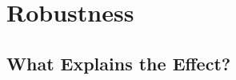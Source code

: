 \documentclass[red]{beamer}
\newcommand{\mco}[1]{\multicolumn{1}{c}{#1}}
\newcommand{\X}{$\times$ }
\newcommand{\hs}{\hspace{15pt}}
\begin{document}
% 
% 
% 





\section{Robustness}

\subsection{What Explains the Effect?}
\end{document}
